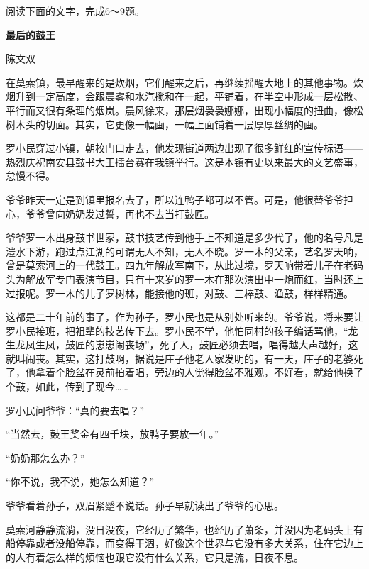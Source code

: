 \documentclass[11pt,a4paper]{ctexart}
\begin{document}
\par\vspace{2.2em}

阅读下面的文字，完成6～9题。

\begin{center}{\bfseries 最后的鼓王}\par\vspace{0.15em}陈文双\end{center}

\begin{materialtext}
在莫索镇，最早醒来的是炊烟，它们醒来之后，再继续摇醒大地上的其他事物。炊烟升到一定高度，会跟晨雾和水汽搅和在一起，平铺着，在半空中形成一层松散、平行而又很有条理的烟岚。晨风徐来，那层烟袅袅娜娜，出现小幅度的扭曲，像松树木头的切面。其实，它更像一幅画，一幅上面铺着一层厚厚丝绸的画。

罗小民穿过小镇，朝校门口走去，他发现街道两边出现了很多鲜红的宣传标语——热烈庆祝南安县鼓书大王擂台赛在我镇举行。这是本镇有史以来最大的文艺盛事，怠慢不得。

爷爷昨天一定是到镇里报名去了，所以连鸭子都可以不管。可是，他很替爷爷担心，爷爷曾向奶奶发过誓，再也不去当打鼓匠。

爷爷罗一木出身鼓书世家，鼓书技艺传到他手上不知道是多少代了，他的名号凡是澧水下游，跑过点江湖的可谓无人不知，无人不晓。罗一木的父亲，艺名罗天响，曾是莫索河上的一代鼓王。四九年解放军南下，从此过境，罗天响带着儿子在老码头为解放军专门表演节目，只有十来岁的罗一木在那次演出中一炮而红，当时还上过报呢。罗一木的儿子罗树林，能接他的班，对鼓、三棒鼓、渔鼓，样样精通。

这都是二十年前的事了，作为孙子，罗小民也是从别处听来的。爷爷说，将来要让罗小民接班，把祖辈的技艺传下去。罗小民不学，他怕同村的孩子编话骂他，“龙生龙凤生凤，鼓匠的崽崽闹丧场”，死了人，鼓匠必须去唱，唱得越大声越好，这就叫闹丧。其实，这打鼓啊，据说是庄子他老人家发明的，有一天，庄子的老婆死了，他拿着个脸盆在灵前拍着唱，旁边的人觉得脸盆不雅观，不好看，就给他换了个鼓，如此，传到了现今……

罗小民问爷爷：“真的要去唱？”

“当然去，鼓王奖金有四千块，放鸭子要放一年。”

“奶奶那怎么办？”

“你不说，我不说，她怎么知道？”

爷爷看着孙子，双眉紧蹙不说话。孙子早就读出了爷爷的心思。

莫索河静静流淌，没日没夜，它经历了繁华，也经历了萧条，并没因为老码头上有船停靠或者没船停靠，而变得干涸，好像这个世界与它没有多大关系，住在它边上的人有着怎么样的烦恼也跟它没有什么关系，它只是流，日夜不息。


\end{materialtext}
\end{document}
